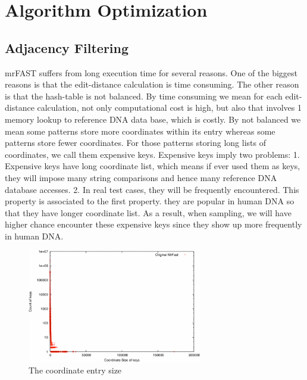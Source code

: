 \section{Algorithm Optimization} \label{sec:algorithm}

\subsection{Adjacency Filtering} \label{sec:af} 

mrFAST suffers from long execution time for several reasons. One of the biggest
reasons is that the edit-distance calculation is time consuming. The other
reason is that the hash-table is not balanced. By time consuming we mean for
each edit-distance calculation, not only computational cost is high, but also
that involves 1 memory lookup to reference DNA data base, which is costly. By
not balanced we mean some patterns store more coordinates within its entry
whereas some patterns store fewer coordinates. For those patterns storing long
lists of coordinates, we call them expensive keys. Expensive keys imply two
problems: 1. Expensive keys have long coordinate list, which means if ever
used them as keys, they will impose many string comparisons and hence many
reference DNA database accesses. 2. In real test cases, they will be
frequently encountered. This property is associated to the first property.
they are popular in human DNA so that they have longer coordinate list. As a
result, when sampling, we will have higher chance encounter these expensive
keys since they show up more frequently in human DNA. \\
 
\begin{figure}[t] 
\centering
\vspace{0.1in}
\includegraphics[width=3in]{./figure/Entry_Size_B.pdf} \vspace{0in}
\caption{The coordinate entry size}
\label{fig:entry_size} 
\end{figure}

